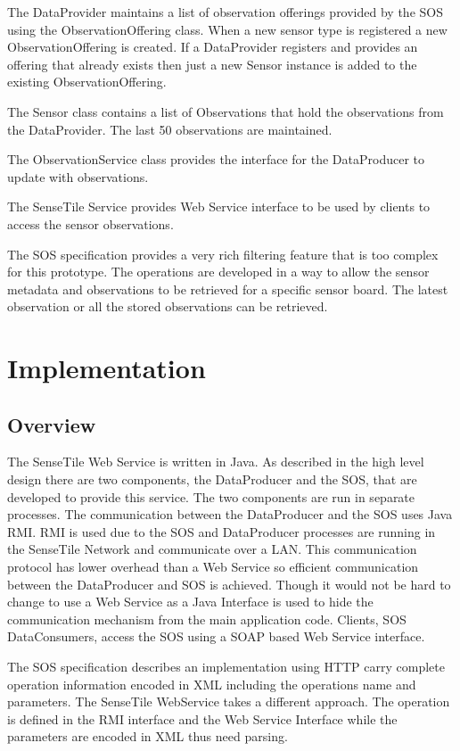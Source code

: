 \documentclass[]{final_report}
\begin{document}
The DataProvider maintains a list of observation offerings provided by the SOS using the ObservationOffering class. When a new sensor type is registered a new ObservationOffering is created. If a DataProvider registers and provides an offering that already exists then just a new Sensor instance is added to the existing ObservationOffering.
 
The Sensor class contains a list of Observations that hold the observations from the DataProvider. The last 50 observations are maintained.

The ObservationService class provides the interface for the DataProducer to update with observations.

The SenseTile Service provides Web Service interface to be used by clients to access the sensor observations.

The SOS specification provides a very rich filtering feature that is too complex for this prototype. The operations are developed in a way to allow the sensor metadata and observations to be retrieved for a specific sensor board. The latest observation or all the stored observations can be retrieved.

\chapter{Implementation}
\section{Overview}
The SenseTile Web Service is written in Java. As described in the high level design there are two components, the DataProducer and the SOS, that are developed to provide this service. The two components are run in separate processes. The communication between the DataProducer and the SOS uses Java RMI. RMI is used due to the SOS and DataProducer
processes are running in the SenseTile Network and communicate over a LAN. This communication protocol has lower overhead than a Web Service so efficient communication between the DataProducer and SOS is achieved. Though it would not be hard to change to use a Web Service as a Java Interface is used to hide the communication mechanism from the main application code. Clients, SOS DataConsumers, access the SOS using a SOAP based Web Service interface. 

The SOS specification describes an implementation using HTTP carry complete operation information encoded in XML including the operations name and parameters. The SenseTile WebService takes a different approach. The operation is defined in the RMI interface and the Web Service Interface while the parameters are encoded in XML thus need parsing.
\end{document}
